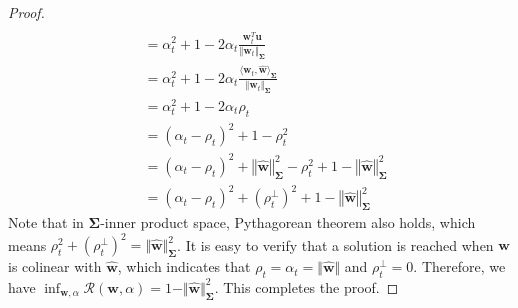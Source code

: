 \documentclass[pdflatex,sn-basic]{sn-jnl}%
\theoremstyle{thmstyleone}%
\begin{document}
\begin{appendices}
\begin{proof}
\begin{equation*}
\begin{aligned}
    \\ & =
    \alpha_t^{2} + 1 - 2 \alpha_t \frac{\mathbf{w}_t^{T} \mathbf{u}}{\left\Vert \mathbf{w}_t \right\Vert_{\mathbf{\Sigma}}}
    \\ & =
    \alpha_t^{2} + 1 - 2 \alpha_t \frac{\langle \mathbf{w}_t, \hat{\mathbf{w}} \rangle_{\mathbf{\Sigma}}}{\left\Vert \mathbf{w}_t \right\Vert_{\mathbf{\Sigma}}}
    \\ & =
    \alpha_t^{2} + 1 - 2 \alpha_t \rho_t
    \\ & = 
    (\alpha_t - \rho_t)^{2} + 1 - \rho_t^{2} 
    \\ & = 
    (\alpha_t - \rho_t)^{2} + \left\Vert \hat{\mathbf{w}} \right\Vert_{\mathbf{\Sigma}}^{2} - \rho_t^{2} 
    + 1 - \left\Vert \hat{\mathbf{w}} \right\Vert_{\mathbf{\Sigma}}^{2}
    \\ & = 
    (\alpha_t - \rho_t)^{2} + 
    \left( \rho_t^{\perp} \right)^2
    + 1 - \left\Vert \hat{\mathbf{w}} \right\Vert_{\mathbf{\Sigma}}^{2}
  \end{aligned}
  \end{equation*}
  Note that in $\mathbf{\Sigma}$-inner product space, Pythagorean theorem also holds, 
  which means $\rho_t^2 + \left( \rho_t^\perp \right)^2 = 
  \Vert \hat{\mathbf{w}}\Vert_{\mathbf{\Sigma}}^2$. It is easy to verify that a solution is reached when \( \mathbf{w} \) is colinear with \(\hat{\mathbf{w}} \), which indicates that \( \rho_t = \alpha_t = \Vert \hat{\mathbf{w}} \Vert \) and \( \rho_t^{\perp} = 0 \). Therefore, we have $\inf_{\mathbf{w}, \alpha} \mathcal{R} (\mathbf{w}, \alpha) = 1 - \Vert \hat{\mathbf{w}} \Vert_{\mathbf{\Sigma}}^2$. This completes the proof. 
\end{proof}


\end{appendices}
\end{document}
